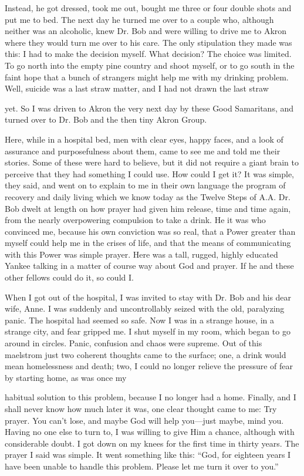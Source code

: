 Instead, he got dressed, took me out, bought me three or four double shots and put me to bed. The next day he turned me over to a couple who, although neither was an alcoholic, knew Dr. Bob and were willing to drive me to Akron where they would turn me over to his care. The only stipulation they made was this: I had to make the decision myself. What decision? The choice was limited. To go north into the empty pine country and shoot myself, or to go south in the faint hope that a bunch of strangers might help me with my drinking problem. Well, suicide was a last straw matter, and I had not drawn the last straw

yet. So I was driven to Akron the very next day by these Good Samaritans, and turned over to Dr. Bob and the then tiny Akron Group.

Here, while in a hospital bed, men with clear eyes, happy faces, and a look of assurance and purposefulness about them, came to see me and told me their stories. Some of these were hard to believe, but it did not require a giant brain to perceive that they had something I could use. How could I get it? It was simple, they said, and went on to explain to me in their own language the program of recovery and daily living which we know today as the Twelve Steps of A.A. Dr. Bob dwelt at length on how prayer had given him release, time and time again, from the nearly overpowering compulsion to take a drink. He it was who convinced me, because his own conviction was so real, that a Power greater than myself could help me in the crises of life, and that the means of communicating with this Power was simple prayer. Here was a tall, rugged, highly educated Yankee talking in a matter of course way about God and prayer. If he and these other fellows could do it, so could I.

When I got out of the hospital, I was invited to stay with Dr. Bob and his dear wife, Anne. I was suddenly and uncontrollably seized with the old, paralyzing panic. The hospital had seemed so safe. Now I was in a strange house, in a strange city, and fear gripped me. I shut myself in my room, which began to go around in circles. Panic, confusion and chaos were supreme. Out of this maelstrom just two coherent thoughts came to the surface; one, a drink would mean homelessness and death; two, I could no longer relieve the pressure of fear by starting home, as was once my

habitual solution to this problem, because I no longer had a home. Finally, and I shall never know how much later it was, one clear thought came to me: Try prayer. You can’t lose, and maybe God will help you—just maybe, mind you. Having no one else to turn to, I was willing to give Him a chance, although with considerable doubt. I got down on my knees for the first time in thirty years. The prayer I said was simple. It went something like this: “God, for eighteen years I have been unable to handle this problem. Please let me turn it over to you.”


